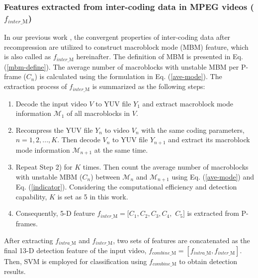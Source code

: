 \documentclass[journal,sort]{IEEEtran}
\begin{document}
 
 
\subsubsection{Features extracted from inter-coding data in MPEG videos ($f_{inter\_\text{M}}$)\label{inter_MBM}}
 In our previous work \cite{chen2016detecting}, the convergent properties of inter-coding data after recompression are utilized to construct macroblock mode (MBM) feature, which is also called as $f_{inter\_\text{M}}$ hereinafter. The definition of MBM is presented in Eq. (\ref{mbm-define}). The average number of macroblocks with unstable MBM per P-frame ($C_n$) is calculated using the formulation in Eq. (\ref{ave-mode}). The extraction process of $f_{inter\_\text{M}}$ is summarized as the following steps:

\begin{enumerate}
	
 \item Decode the input video $V$ to YUV file $Y_1$ and extract macroblock mode information $\mathcal{M}_1$ of all
 macroblocks in $V$. 
 \item Recompress the YUV file $Y_n$ to video $V_n$ with
 the same coding parameters, $n = 1,2,...,K$. Then decode $V_n$ to YUV file $Y_{n+1}$ and extract its macroblock mode information $\mathcal{M}_{n+1}$ at the same time.
 \item Repeat Step 2) for $K$ times. Then count the average number of macroblocks with unstable MBM ($C_n$) between
 $\mathcal{M}_n$ and $\mathcal{M}_{n+1}$ using Eq. (\ref{ave-mode}) and Eq. (\ref{indicator}). Considering the computational efficiency and detection capability, $K$ is set as 5 in this work.
 
 \item Consequently, 5-D feature $f_{inter\_\text{M}}=[C_1,C_2,C_3,C_4,$ $C_5 ]$ is extracted from P-frames.
\end{enumerate}

 
After extracting $f_{intra\_\text{M}}$ and $f_{inter\_\text{M}}$, two sets of features are concatenated as the final 13-D detection feature of the input video, $f_{combine\_\text{M}} = [f_{intra\_\text{M}}, f_{inter\_\text{M}}]$. Then, SVM is employed for classification using $f_{combine\_\text{M}}$ to obtain detection results.
\end{document}
